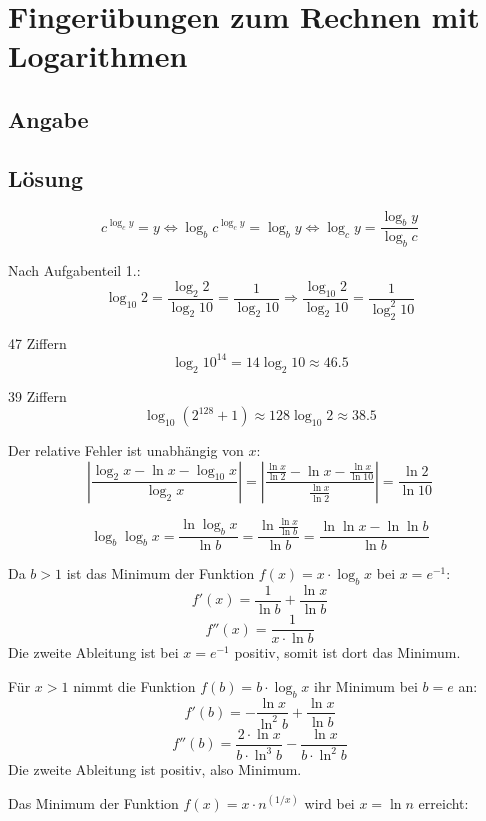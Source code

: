 \section*{Fingerübungen zum Rechnen mit Logarithmen}
\subsection*{Angabe}


\subsection*{Lösung}
\begin{flushenum}
\item
	\[ c^{\log_c y} = y \Leftrightarrow 
	\log_b c^{\log_c y} = \log_b y \Leftrightarrow \log_c y =
	\frac{\log_b y}{\log_b c}\]
\item Nach Aufgabenteil 1.:
	\[ \log_{10} 2 = \frac{\log_2 2}{\log_2 10} = \frac{1}{\log_2 10}
	\Rightarrow \frac{\log_{10} 2}{\log_2 10} = \frac{1}{\log_2^2 10} \]
\item 47 Ziffern \[ \log_2 10^{14} = 14 \log_2 10 \approx 46.5 \]
\item 39 Ziffern \[ \log_{10} (2^{128} + 1) \approx 128 \log_{10} 2 \approx 38.5 \]
\item Der relative Fehler ist unabhängig von $x$:
	\[ \left| \frac{\log_2 x - \ln x - \log_{10} x}{\log_2 x} \right| =
	\left| \frac{\frac{\ln x}{\ln 2} - \ln x - \frac{\ln x}{\ln
	10}}{\frac{\ln x}{\ln 2}} \right| = \frac{\ln 2}{\ln 10} \]
\item
	\[ \log_b \log_b x = \frac{\ln \log_b x}{\ln b} = \frac{\ln \frac{\ln
	x}{\ln b}}{\ln b} = \frac{\ln \ln x - \ln \ln b}{\ln b}\]
\item Da $b > 1$ ist das Minimum der Funktion $f(x) = x \cdot \log_b x$ bei $x = e^{-1}$:
	\[ f'(x) = \frac{1}{\ln b} + \frac{\ln x}{\ln b} \]
	\[ f''(x) = \frac{1}{x \cdot \ln b} \]
	Die zweite Ableitung ist bei $x = e^{-1}$ positiv, somit ist dort das Minimum.
\item Für $x > 1$ nimmt die Funktion $f(b) = b \cdot \log_b x$ ihr Minimum bei $b = e$ an:
	\[ f'(b) = -\frac{\ln x}{\ln^2 b} + \frac{\ln x}{\ln b} \]
	\[f''(b) = \frac{2 \cdot \ln x}{b \cdot \ln^3 b} - \frac{\ln x}{b \cdot \ln^2 b} \]
	Die zweite Ableitung ist positiv, also Minimum.
\item Das Minimum der Funktion $f(x) = x \cdot n^(1/x)$ wird bei $x = \ln n$ erreicht:

\end{flushenum}
